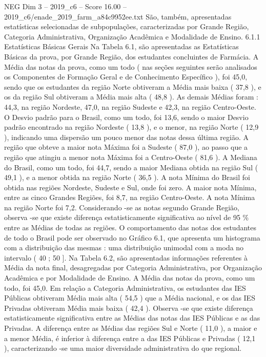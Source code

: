 \begin{textsample}{NEG Dim 3 – 2019\_c6 – Score 16.00 – 2019\_c6/enade\_2019\_farm\_a84c9952ee.txt}
São, também, apresentadas estatísticas selecionadas de subpopulações, caracterizadas por Grande Região, Categoria Administrativa, Organização Acadêmica e Modalidade de Ensino. 6.1.1 Estatísticas Básicas Gerais Na Tabela 6.1, são apresentadas as Estatísticas Básicas da prova, por Grande Região, dos estudantes concluintes de Farmácia.
A Média das notas da prova, como um todo ( nas seções seguintes serão analisados os Componentes de Formação Geral e de Conhecimento Específico ), foi 45,0, sendo que os estudantes da região Norte obtiveram a Média mais baixa ( 37,8 ), e os da região Sul obtiveram a Média mais alta ( 48,8 ).
As demais Médias foram : 44,3, na região Nordeste, 47,0, na região Sudeste e 42,3, na região Centro-Oeste.
O Desvio padrão para o Brasil, como um todo, foi 13,6, sendo o maior Desvio padrão encontrado na região Nordeste ( 13,8 ), e o menor, na região Norte ( 12,9 ), indicando uma dispersão um pouco menor das notas dessa última região.
A região que obteve a maior nota Máxima foi a Sudeste ( 87,0 ), ao passo que a região que atingiu a menor nota Máxima foi a Centro-Oeste ( 81,6 ).
A Mediana do Brasil, como um todo, foi 44,7, sendo a maior Mediana obtida na região Sul ( 49,1 ), e a menor obtida na região Norte ( 36,5 ).
A nota Mínima do Brasil foi obtida nas regiões Nordeste, Sudeste e Sul, onde foi zero.
A maior nota Mínima, entre as cinco Grandes Regiões, foi 8,7, na região Centro-Oeste.
A nota Mínima na região Norte foi 7,2.
Considerando -se as notas segundo Grande Região, observa -se que existe diferença estatisticamente significativa ao nível de 95 \% entre as Médias de todas as regiões.
O comportamento das notas dos estudantes de todo o Brasil pode ser observado no Gráfico 6.1, que apresenta um histograma com a distribuição das mesmas : uma distribuição unimodal com a moda no intervalo ( 40 ; 50 ].
Na Tabela 6.2, são apresentadas informações referentes à Média da nota final, desagregadas por Categoria Administrativa, por Organização Acadêmica e por Modalidade de Ensino.
A Média das notas da prova, como um todo, foi 45,0.
Em relação a Categoria Administrativa, os estudantes das IES Públicas obtiveram Média mais alta ( 54,5 ) que a Média nacional, e os das IES Privadas obtiveram Média mais baixa ( 42,4 ).
Observa -se que existe diferença estatisticamente significativa entre as Médias das notas das IES Públicas e as das Privadas.
A diferença entre as Médias das regiões Sul e Norte ( 11,0 ), a maior e a menor Média, é inferior à diferença entre a das IES Públicas e Privadas ( 12,1 ), caracterizando -se uma maior diversidade administrativa do que regional.

\end{textsample}
